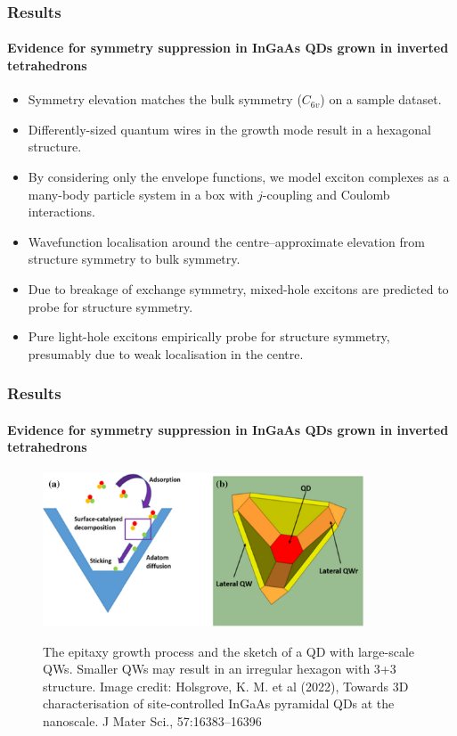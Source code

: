 \documentclass[english]{beamer}
\begin{document}
  \begin{frame}
  	\frametitle{Results}
  	\framesubtitle{Evidence for symmetry suppression in InGaAs QDs grown in inverted tetrahedrons}
  	\begin{itemize}
  		\item Symmetry elevation matches the bulk symmetry ($C_{6v}$) on a sample dataset.
  		\item Differently-sized quantum wires in the growth mode result in a hexagonal structure.
  		\item By considering only the envelope functions, we model exciton complexes as a many-body particle system in a box with $j$-coupling and Coulomb interactions.
  		\item Wavefunction localisation around the centre--approximate elevation from structure symmetry to bulk symmetry.
  		\item Due to breakage of exchange symmetry, mixed-hole excitons are predicted to probe for structure symmetry.
  		\item Pure light-hole excitons empirically probe for structure symmetry, presumably due to weak localisation in the centre.
  	\end{itemize}
  \end{frame}
  
  \begin{frame}
		\frametitle{Results}
		\framesubtitle{Evidence for symmetry suppression in InGaAs QDs grown in inverted tetrahedrons}
		\begin{figure}
	\centering
    		\includegraphics[width=0.85\textwidth]{images/MOVPE_process}
    		\label{fig:growth}
    		\caption{The epitaxy growth process and the sketch of a QD with large-scale QWs. Smaller QWs may result in an irregular hexagon with 3+3 structure. Image credit: Holsgrove, K. M. et al (2022), Towards 3D characterisation of site-controlled InGaAs pyramidal QDs at the nanoscale. J Mater Sci., 57:16383--16396}
	\end{figure}
  \end{frame}
  
\end{document}
